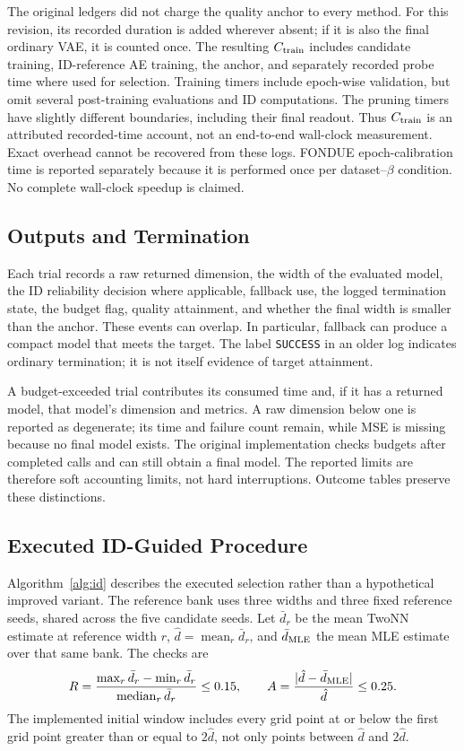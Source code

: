 \documentclass[make,article,submit,pdftex,moreauthors]{Definitions/mdpi}
\begin{document}
The original ledgers did not charge the quality anchor to every method.
For this revision, its recorded duration is added wherever absent; if it
is also the final ordinary VAE, it is counted once. The resulting
$C_{\rm train}$ includes candidate training, ID-reference AE training,
the anchor, and separately recorded probe time where used for selection.
Training timers include epoch-wise validation, but omit several
post-training evaluations and ID computations. The pruning timers have
slightly different boundaries, including their final readout. Thus
$C_{\rm train}$ is an attributed recorded-time account, not an end-to-end
wall-clock measurement. Exact overhead cannot be recovered from these
logs. FONDUE epoch-calibration time is reported separately because it is
performed once per dataset--$\beta$ condition. No complete wall-clock
speedup is claimed.

\subsection{Outputs and Termination}\label{sec:outcomes}
Each trial records a raw returned dimension, the width of the evaluated
model, the ID reliability decision where applicable, fallback use, the
logged termination state, the budget flag, quality attainment, and whether
the final width is smaller than the anchor. These events can overlap.
In particular, fallback can produce a compact model that meets the target.
The label \texttt{SUCCESS} in an older log indicates ordinary termination;
it is not itself evidence of target attainment.

A budget-exceeded trial contributes its consumed time and, if it has a
returned model, that model's dimension and metrics. A raw dimension below
one is reported as degenerate; its time and failure count remain, while
MSE is missing because no final model exists. The original implementation
checks budgets after completed calls and can still obtain a final model.
The reported limits are therefore soft accounting limits, not hard
interruptions. Outcome tables preserve these distinctions.

\subsection{Executed ID-Guided Procedure}\label{sec:algorithm}
Algorithm~\ref{alg:id} describes the executed selection rather than a
hypothetical improved variant. The reference bank uses three widths and
three fixed reference seeds, shared across the five candidate seeds.
Let $\bar d_r$ be the mean TwoNN estimate at reference width $r$,
$\hat d=\operatorname{mean}_r\bar d_r$, and $\bar d_{\rm MLE}$ the mean
MLE estimate over that same bank. The checks are
\begin{equation}
 R=\frac{\max_r\bar d_r-\min_r\bar d_r}{\operatorname{median}_r\bar d_r}
 \le0.15,\qquad
 A=\frac{|\hat d-\bar d_{\rm MLE}|}{\hat d}\le0.25.
 \label{eq:checks}
\end{equation}
The implemented initial window includes every grid point at or below the
first grid point greater than or equal to $2\hat d$, not only points
between $\hat d$ and $2\hat d$.
\end{document}
